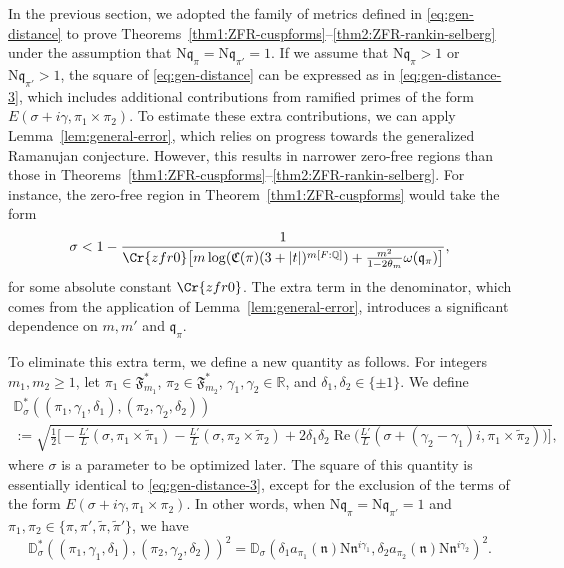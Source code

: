 \documentclass[12pt,reqno]{amsart}
\renewcommand{\tilde}{\widetilde}
\theoremstyle{remark}
\renewcommand{\tilde}{\widetilde}
\DeclareMathOperator{\Real}{Re}
\renewcommand{\tilde}{\widetilde}
\newcommand{\N}{\mathrm{N}}
\newcommand{\Q}{\mathbb{Q}}
\newcommand{\kq}{\mathfrak{q}}
\newcommand{\kn}{\mathfrak{n}}
\numberwithin{equation}{section}
\begin{document}
    In the previous section, we adopted the family of metrics defined in \eqref{eq:gen-distance} to prove Theorems~\ref{thm1:ZFR-cuspforms}--\ref{thm2:ZFR-rankin-selberg} under the assumption that $\N\kq_\pi  = \N\kq_{\pi'} =1$. If we assume that $\N\kq_{\pi} > 1$ or $\N\kq_{\pi'} > 1$, the square of \eqref{eq:gen-distance} %
    can be expressed as in \eqref{eq:gen-distance-3}, which includes additional contributions from ramified primes of the form  $E(\sigma+i\gamma, \pi_1 \times \pi_2)$. %
    To estimate these extra contributions, we can apply Lemma~\ref{lem:general-error}, which relies on progress towards the generalized Ramanujan conjecture. However, this results in narrower zero-free regions than those in Theorems~\ref{thm1:ZFR-cuspforms}--\ref{thm2:ZFR-rankin-selberg}. For instance, the zero-free region in Theorem~\ref{thm1:ZFR-cuspforms} would take the form
    \begin{equation*}
        \sigma < 1- \frac{1}{\Cr{zfr0}\big[m\log(\mathfrak{C}(\pi)(3+|t|)^{m[F:\Q]})+\frac{m^2}{1-2\theta_{m}}\omega(\kq_{\pi})\big]},
    \end{equation*}
    for some absolute constant $\Cr{zfr0}$.
   The extra term in the denominator, which comes from the application of Lemma~\ref{lem:general-error},  introduces a significant dependence on $m,m'$ and $\kq_{\pi}$.
    
    To eliminate this extra term,  %
    we define a new quantity as follows. For integers $m_1, m_2 \ge 1$,  let $\pi_1 \in \mathfrak{F}_{m_1}^*$, $\pi_2 \in \mathfrak{F}_{m_2}^*$, $\gamma_1,\gamma_2 \in \mathbb{R}$, and $\delta_1, \delta_2 \in \{\pm1\}$. We define
    \begin{multline}\label{eq:def-d-leveln}
    \mathbb{D}^*_{\sigma} ((\pi_1, \gamma_1, \delta_1), (\pi_2, \gamma_2, \delta_2))\\
    := \sqrt{\frac{1}{2}\Big[-\frac{L'}{L}(\sigma, \pi_1 \times \tilde{\pi}_1) -\frac{L'}{L}(\sigma, \pi_2 \times \tilde{\pi}_2) +2\delta_1\delta_2 \Real\Big(\frac{L'}{L}(\sigma+(\gamma_2-\gamma_1)i, \pi_1 \times \tilde{\pi}_2) \Big)\Big]},
		\end{multline} 
    where $\sigma$ is a parameter to be optimized later.
    The square of this quantity is essentially identical to \eqref{eq:gen-distance-3}, except for the exclusion of the terms of the form $E(\sigma+i\gamma, \pi_1 \times \pi_2)$. In other words, when $\N\kq_\pi  = \N\kq_{\pi'} =1$ and $\pi_1, \pi_2 \in \{\pi, \pi', \tilde{\pi}, \tilde{\pi}'\}$, we have
    \[
    \mathbb{D}^*_{\sigma} ((\pi_1, \gamma_1, \delta_1), (\pi_2, \gamma_2, \delta_2))^2 = \mathbb{D}_{\sigma}(\delta_1a_{\pi_1}(\kn)\N\kn^{i\gamma_1},\delta_2 a_{\pi_2}(\kn)\N\kn^{i\gamma_2})^2.
    \]
\end{document}
